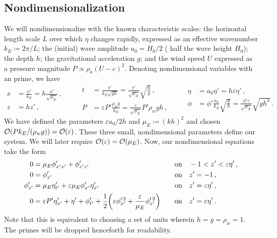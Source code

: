 \documentclass{jfm}
\renewcommand*{\epsilon}{\varepsilon}
\begin{document}
\subsection{\label{sec:nondim} Nondimensionalization}
We will nondimensionalize with the known characteristic scales: the
horizontal length scale $L$ over which $\eta$ changes
rapidly, expressed as an effective wavenumber $k_E \coloneqq 2 \pi/L$;
the (initial) wave amplitude $a_0 = H_0/2$ (\ie{} half the wave height
$H_0$); the depth $h$; the gravitational acceleration $g$; and the wind
speed $U$ expressed as a pressure magnitude $P \propto \rho_a (U-c)^2$.
Denoting nondimensional variables with an prime, we have
\begin{equation*}
  \begin{aligned}
  x &= \frac{x'}{k_E} = h \frac{x'}{\sqrt{\mu_E}}\,, \\
  z &= h z' \,,
  \end{aligned}
  \qquad
  \begin{aligned}
  t &= \frac{t'}{k_E\sqrt{g h}}
    = \frac{t'}{\sqrt{\mu_E}} \sqrt{\frac{h}{g}} \,, \\
  P &= \epsilon P' \frac{\rho_w g}{k_E}
    = \frac{\epsilon}{\sqrt{\mu_E}} P' \rho_w g h \,,
  \end{aligned}
  \qquad
  \begin{aligned}
  \eta &= a_0 \eta' = h \epsilon \eta' \,, \\
  \phi &= \phi'\frac{a_0}{k_E}\sqrt{\frac{g}{h}}
    = \frac{\phi'\epsilon}{\sqrt{\mu_E}}\sqrt{g h^3} \,.
  \end{aligned}
\end{equation*}
We have defined the parameters $\epsilon a_0/2h$ and $\mu_E \coloneqq
(kh)^2$ and chosen $\order{P k_E/(\rho_w g)} = \order{\epsilon}$.
These three small, nondimensional parameters define our system.
We will later require $\order{\epsilon} = \order{\mu_E}$.
Now, our nondimensional equations take the form
\begin{alignat}{2}
  0 &= \mu_E \phi'_{x'x'} + \phi'_{z'z'} &&\qq{on}
    -1 < z' < \epsilon \eta' \,, \label{eq:laplace_nondim} \\
  0 &= \phi'_{z'} &&\qq{on} z'=-1 \,, \label{eq:bottom_bc_nondim} \\
  \phi'_{z'} &= \mu_E \eta'_{t'} +
    \epsilon \mu_E \phi'_{x'} \eta'_{x'} &&\qq{on} z' = \epsilon \eta' \,,
    \label{eq:kinematic_bc_nondim} \\
  0 &= \epsilon P' \eta'_{x'} +  \eta' + \phi'_{t'} + \frac{1}{2}
    \pqty{\epsilon \phi_{x'}^{\prime \, 2} + \frac{\epsilon}{\mu_E}
    \phi_{z'}^{\prime \, 2}} &&\qq{on} z'= \epsilon \eta' \,.
    \label{eq:dynamic_bc_nondim}
\end{alignat}
Note that this is equivalent to choosing a set of units wherein $h = g =
\rho_w = 1$.
The primes will be dropped henceforth for readability.
\end{document}
